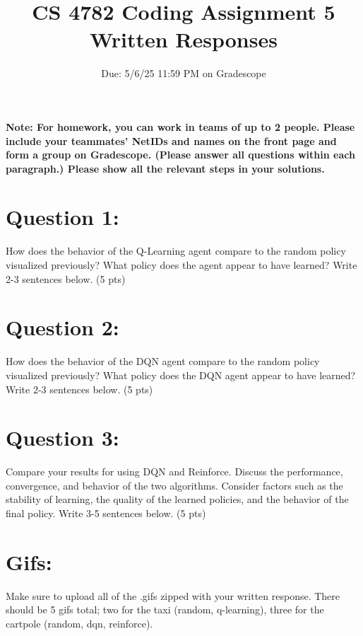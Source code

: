 \documentclass{article}
\title{CS 4782 Coding Assignment 5 Written Responses\vspace{-10pt}}
\author{Due: 5/6/25 11:59 PM on Gradescope}
\begin{document}
    \maketitle
    \textbf{Note: For homework, you can work in teams of up to 2 people. Please include your teammates’ NetIDs and names on the front page and form a group on Gradescope. (Please answer all questions within each paragraph.) Please show all the relevant steps in your solutions. }
\maketitle
\section*{Question 1:}
How does the behavior of the Q-Learning agent compare to the random policy visualized previously? What policy does the agent appear to have learned? Write 2-3 sentences below. (5 pts)


\section*{Question 2:}
How does the behavior of the DQN agent compare to the random policy visualized previously? What policy does the DQN agent appear to have learned? Write 2-3 sentences below. (5 pts)


\section*{Question 3:}
Compare your results for using DQN and Reinforce. Discuss the performance, convergence, and behavior of the two algorithms. Consider factors such as the stability of learning, the quality of the learned policies, and the behavior of the final policy. Write 3-5 sentences below. (5 pts)

\section*{Gifs:}
Make sure to upload all of the .gifs zipped with your written response. There should be 5 gifs total; two for the taxi (random, q-learning), three for the cartpole (random, dqn, reinforce).
\end{document}

